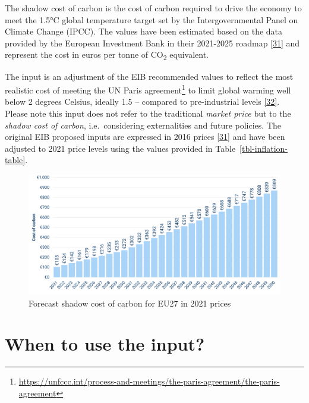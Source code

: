 \documentclass[
  11pt,
  a4paper,
]{book}
\DeclareRobustCommand{\href}[2]{#2\footnote{\url{#1}}}
\begin{document}
The shadow cost of carbon is the cost of carbon required to drive the
economy to meet the 1.5°C global temperature target set by the
Intergovernmental Panel on Climate Change (IPCC). The values have been
estimated based on the data provided by the European Investment Bank in
their 2021-2025 roadmap \protect\hyperlink{ref-eib2020}{{[}31{]}} and
represent the cost in euros per tonne of CO\textsubscript{2} equivalent.

The input is an adjustment of the EIB recommended values to reflect the
most realistic cost of meeting the
\href{https://unfccc.int/process-and-meetings/the-paris-agreement/the-paris-agreement}{UN
Paris agreement} to limit global warming well below 2 degrees Celsius,
ideally 1.5 -- compared to pre-industrial levels
\protect\hyperlink{ref-ipcc2018}{{[}32{]}}. Please note this input does
not refer to the traditional \emph{market price} but to the \emph{shadow
cost of carbon}, i.e.~considering externalities and future policies. The
original EIB proposed inputs are expressed in 2016 prices
\protect\hyperlink{ref-eib2020}{{[}31{]}} and have been adjusted to 2021
price levels using the values provided in
Table~\ref{tbl-inflation-table}.

\begin{figure}

{\centering \includegraphics{chapters/../figures/cost_of_carbon.png}

}

\caption{\label{fig-cost-of-carbon}Forecast shadow cost of carbon for
EU27 in 2021 prices}

\end{figure}

\hypertarget{when-to-use-the-input-4}{%
\section{When to use the input?}\label{when-to-use-the-input-4}}
\end{document}
